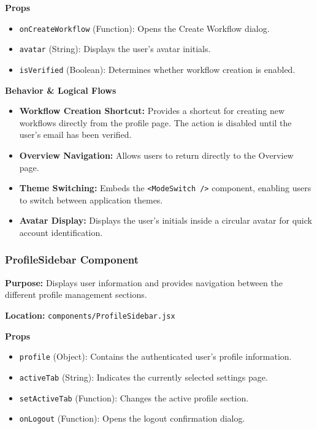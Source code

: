 \vspace{0.2cm}
\noindent\textbf{Props}
\begin{itemize}
    \item \texttt{onCreateWorkflow} (Function): Opens the Create Workflow dialog.
    \item \texttt{avatar} (String): Displays the user's avatar initials.
    \item \texttt{isVerified} (Boolean): Determines whether workflow creation is enabled.
\end{itemize}

\vspace{0.2cm}
\noindent\textbf{Behavior \& Logical Flows}
\begin{itemize}
    \item \textbf{Workflow Creation Shortcut:} Provides a shortcut for creating new workflows directly from the profile page. The action is disabled until the user's email has been verified.
    \item \textbf{Overview Navigation:} Allows users to return directly to the Overview page.
    \item \textbf{Theme Switching:} Embeds the \texttt{<ModeSwitch />} component, enabling users to switch between application themes.
    \item \textbf{Avatar Display:} Displays the user's initials inside a circular avatar for quick account identification.
\end{itemize}


\subsubsection{ProfileSidebar Component}

\textbf{Purpose:} Displays user information and provides navigation between the different profile management sections.

\vspace{0.2cm}
\noindent\textbf{Location:} \texttt{components/ProfileSidebar.jsx}

\vspace{0.2cm}
\noindent\textbf{Props}
\begin{itemize}
    \item \texttt{profile} (Object): Contains the authenticated user's profile information.
    \item \texttt{activeTab} (String): Indicates the currently selected settings page.
    \item \texttt{setActiveTab} (Function): Changes the active profile section.
    \item \texttt{onLogout} (Function): Opens the logout confirmation dialog.
\end{itemize}

